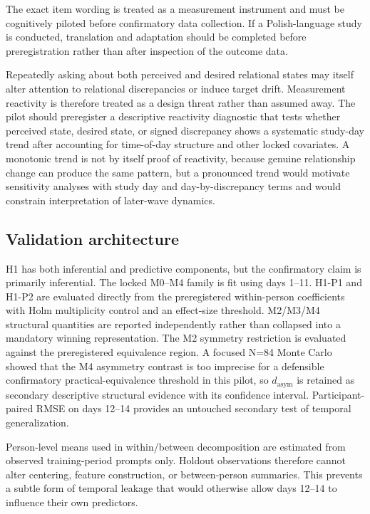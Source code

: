 The exact item wording is treated as a measurement instrument and must be cognitively piloted before confirmatory data collection. If a Polish-language study is conducted, translation and adaptation should be completed before preregistration rather than after inspection of the outcome data.

Repeatedly asking about both perceived and desired relational states may itself alter attention to relational discrepancies or induce target drift. Measurement reactivity is therefore treated as a design threat rather than assumed away. The pilot should preregister a descriptive reactivity diagnostic that tests whether perceived state, desired state, or signed discrepancy shows a systematic study-day trend after accounting for time-of-day structure and other locked covariates. A monotonic trend is not by itself proof of reactivity, because genuine relationship change can produce the same pattern, but a pronounced trend would motivate sensitivity analyses with study day and day-by-discrepancy terms and would constrain interpretation of later-wave dynamics.

\subsection{Validation architecture}

H1 has both inferential and predictive components, but the confirmatory claim is primarily inferential. The locked M0--M4 family is fit using days 1--11. H1-P1 and H1-P2 are evaluated directly from the preregistered within-person coefficients with Holm multiplicity control and an effect-size threshold. M2/M3/M4 structural quantities are reported independently rather than collapsed into a mandatory winning representation. The M2 symmetry restriction is evaluated against the preregistered equivalence region. A focused N=84 Monte Carlo showed that the M4 asymmetry contrast is too imprecise for a defensible confirmatory practical-equivalence threshold in this pilot, so \(d_{\mathrm{asym}}\) is retained as secondary descriptive structural evidence with its confidence interval. Participant-paired RMSE on days 12--14 provides an untouched secondary test of temporal generalization.

Person-level means used in within/between decomposition are estimated from observed training-period prompts only. Holdout observations therefore cannot alter centering, feature construction, or between-person summaries. This prevents a subtle form of temporal leakage that would otherwise allow days 12--14 to influence their own predictors.

